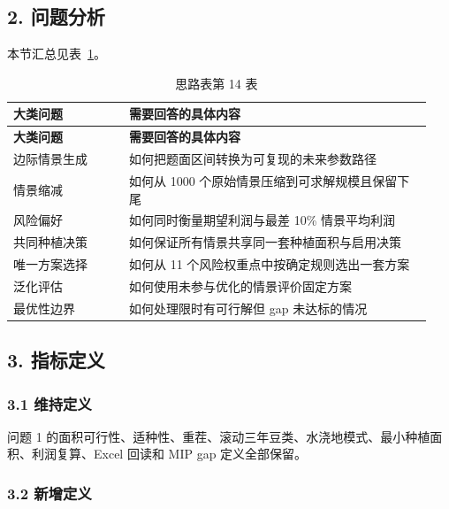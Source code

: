 \documentclass[UTF8,11pt,a4paper]{ctexart}
\begin{document}
\subsection{2. 问题分析}

\noindent 本节汇总见表~\ref{tab:thought-14}。
\begin{longtable}{@{}>{\raggedright\arraybackslash}p{0.26\linewidth}>{\raggedright\arraybackslash}p{0.68\linewidth}@{}}
\caption{思路表第 14 表}\label{tab:thought-14}\\
\toprule
\textbf{大类问题} & \textbf{需要回答的具体内容} \\
\midrule
\endfirsthead
\toprule
\textbf{大类问题} & \textbf{需要回答的具体内容} \\
\midrule
\endhead
边际情景生成 & 如何把题面区间转换为可复现的未来参数路径 \\
情景缩减 & 如何从 1000 个原始情景压缩到可求解规模且保留下尾 \\
风险偏好 & 如何同时衡量期望利润与最差 10\% 情景平均利润 \\
共同种植决策 & 如何保证所有情景共享同一套种植面积与启用决策 \\
唯一方案选择 & 如何从 11 个风险权重点中按确定规则选出一套方案 \\
泛化评估 & 如何使用未参与优化的情景评价固定方案 \\
最优性边界 & 如何处理限时有可行解但 gap 未达标的情况 \\
\bottomrule
\end{longtable}

\subsection{3. 指标定义}

\subsubsection{3.1 维持定义}

问题 1 的面积可行性、适种性、重茬、滚动三年豆类、水浇地模式、最小种植面积、利润复算、Excel 回读和 MIP gap 定义全部保留。

\subsubsection{3.2 新增定义}
\end{document}

